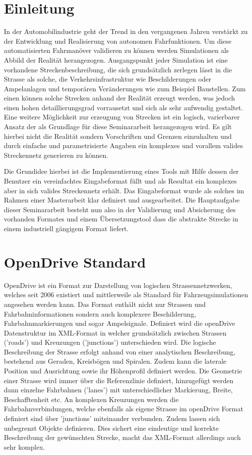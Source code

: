 \chapter{Einleitung}

In der Automobilindustrie geht der Trend in den vergangenen Jahren verstärkt zu der Entwicklung und Realisierung von autonomen Fahrfunktionen. Um diese automatisierten Fahrmanöver validieren zu können werden Simulationen als Abbild der Realität herangezogen. Ausgangspunkt jeder Simulation ist eine vorhandene Streckenbeschreibung, die sich grundsätzlich zerlegen lässt in die Strasse als solche, die Verkehrsinfrastruktur wie Beschilderungen oder Ampelanlagen und temporären Veränderungen wie zum Beispiel Baustellen. Zum einen können solche Strecken anhand der Realität erzeugt werden, was jedoch einen hohen detaillierungsgrad vorrausetzt und sich als sehr aufwendig gestaltet. Eine weitere Möglichkeit zur erzeugung von Strecken ist ein logisch, varierbarer Ansatz der als Grundlage für diese Seminararbeit herangezogen wird. Es gilt hierbei nicht die Realität sondern Vorschriften und Grenzen einzuhalten und durch einfache und parametrisierte Angaben ein komplexes und vorallem valides Streckennetz generieren zu können.

Die Grundidee hierbei ist die Implementierung eines Tools mit Hilfe dessen der Benutzer ein vereinfachtes Eingabeformat füllt und als Resultat ein komplexes aber in sich valides Streckennetz erhält. Das Eingabeformat wurde als solches im Rahmen einer Masterarbeit klar definiert und ausgearbeitet. Die Hauptaufgabe dieser Seminararbeit besteht nun also in der Validierung und Absicherung des vorhanden Formates und einem Übersetzungstool dass die abstrakte Strecke in einem industriell gängigem Format liefert.

\chapter{OpenDrive Standard}
OpenDrive ist ein Format zur Darstellung von logischen Strassennetzwerken, welches seit 2006 existiert und mittlerweile als Standard für Fahrzeugsimulationen angesehen werden kann. Das Format enthält nicht nur Strassen und Fahrbahninformationen sondern auch komplexere Beschilderung, Fahrbahnmarkierungen und sogar Ampelsignale. Definiert wird die openDrive Datenstruktur im XML-Format in welcher grundsätzlich zwischen Strassen ('roads') und Kreuzungen ('junctions') unterschieden wird. Die logische Beschreibung der Strasse erfolgt anhand von einer analytischen Beschreibung, bestehend aus Geraden, Kreisbögen und Spiralen. Zudem kann die laterale Position und Ausrichtung sowie ihr Höhenprofil definiert werden. Die Geometrie einer Strasse wird immer über die Referenzlinie definiert, hinzugefügt werden dann einzelne Fahrbahnen ('lanes') mit unterschiedlicher Markierung, Breite, Beschafftenheit etc. An komplexen Kreuzungen werden die Fahrbahnverbindungen, welche ebenfalls als eigene Strasse im openDrive Format definiert sind über 'junctions' miteinander verbunden. Zudem lassen sich unbegrenzt Objekte definieren. Dies sichert eine eindeutige und korrekte Beschreibung der gewünschten Strecke, macht das XML-Format allerdings auch sehr komplex.  

